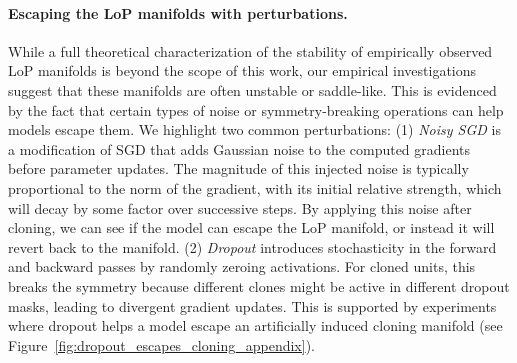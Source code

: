 \documentclass{article}
\newcommand{\GIU}[1]{\todo[color=purple!30,size=\tiny]{GIU: #1}}
\numberwithin{figure}{section}
\begin{document}
\paragraph{Escaping the LoP manifolds with perturbations.}
While a full theoretical characterization of the stability of empirically observed LoP manifolds is beyond the scope of this work, our empirical investigations suggest that these manifolds are often unstable or saddle-like. This is evidenced by the fact that certain types of noise or symmetry-breaking operations can help models escape them. We highlight two common perturbations:
(1) \emph{Noisy SGD} is a modification of SGD that adds Gaussian noise to the computed gradients before parameter updates. The magnitude of this injected noise is typically proportional to the norm of the gradient, with its initial relative strength, which will decay by some factor over successive steps. By applying this noise after cloning, we can see if the model can escape the LoP manifold, or instead it will revert back to the manifold. 
(2) \emph{Dropout} introduces stochasticity in the forward and backward passes by randomly zeroing activations. For cloned units, this breaks the symmetry because different clones might be active in different dropout masks, leading to divergent gradient updates. This is supported by experiments where dropout helps a model escape an artificially induced cloning manifold (see Figure~\ref{fig:dropout_escapes_cloning_appendix}).
    
\end{document}
